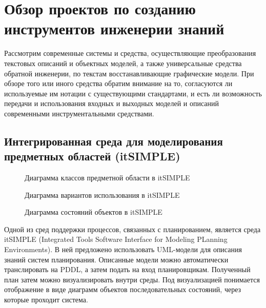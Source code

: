\chapter{Обзор проектов по созданию инструментов инженерии знаний}\label{ch:ex-solutions}
Рассмотрим современные системы и средства, осуществляющие преобразования текстовых описаний и объектных моделей, а также универсальные средства обратной инженерии, по текстам восстанавливающие графические модели. При обзоре того или иного средства обратим внимание на то, согласуются ли используемые им нотации с существующими стандартами, и есть ли возможность передачи и использования входных и выходных моделей и описаний современными инструментальными средствами.


\section{Интегрированная среда для моделирования предметных областей (itSIMPLE)}

    \begin{figure}[h]
        \caption{Диаграмма классов предметной области в itSIMPLE}
        \label{img:its-domain}

    \end{figure}
    
    \begin{figure}[h] 
        \caption{Диаграмма вариантов использования в itSIMPLE}
        \label{img:its-use-case}
    \end{figure}

    \begin{figure}[h] 
        \caption{Диаграмма состояний объектов в itSIMPLE}
        \label{img:its-states}
    \end{figure}

    

    Одной из сред поддержки процессов, связанных с планированием, является среда itSIMPLE \cite{itsimple} (Integrated Tools Software Interface for Modeling PLanning Environments).
 В ней предложено использовать UML-модели для описания знаний систем планирования. Описанные модели можно автоматически транслировать на PDDL, а затем подать на вход планировщикам.
 Полученный план затем можно визуализировать внутри среды.
 Под визуализацией понимается отображение в виде диаграмм объектов последовательных состояний, через которые проходит система.

